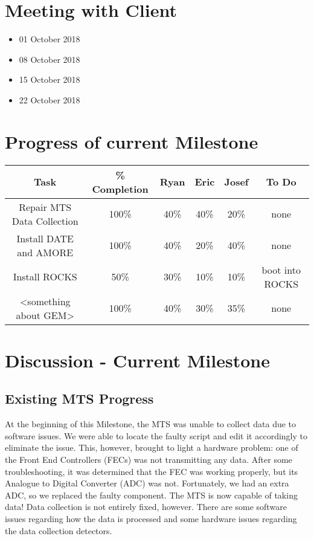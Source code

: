 \documentclass[12pt]{article}
\newcommand\tab[1][1cm]{\hspace*{#1}}
\begin{document}
\section{Meeting with Client}

\begin{itemize}
\item[] 01 October 2018
\item[] 08 October 2018
\item[] 15 October 2018
\item[] 22 October 2018
\end{itemize}

\section{Progress of current Milestone}

  \begin{center}
  \begin{tabular}{|c|c|c|c|c|c|}
    \hline
    Task & \% Completion & Ryan & Eric & Josef & To Do \\
    \hline
    Repair MTS Data Collection & 100\% & 40\% & 40\% & 20\% & none \\
    Install DATE and AMORE & 100\% & 40\% & 20\% & 40\% & none \\
    Install ROCKS & 50\% & 30\% & 10\% & 10\% & boot into ROCKS \\
    <something about GEM> & 100\% & 40\% & 30\% & 35\% & none \\
    \hline   
  \end{tabular}
\end{center}

\section{Discussion - Current Milestone}

\subsection{Existing MTS Progress}

\tab At the beginning of this Milestone, the MTS was unable to collect data due
to software issues. We were able to locate the faulty script and edit it
accordingly to eliminate the issue. This, however, brought to light a hardware
problem: one of the Front End Controllers (FECs) was not transmitting any
data. After some troubleshooting, it was determined that the FEC was working
properly, but its Analogue to Digital Converter (ADC) was not. Fortunately, we
had an extra ADC, so we replaced the faulty component. The MTS is now capable of
taking data! Data collection is not entirely fixed, however. There are some
software issues regarding how the data is processed and some hardware issues
regarding the data collection detectors.
\end{document}
